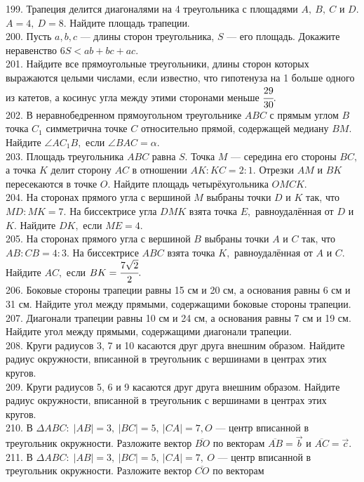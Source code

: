 \documentclass[12pt]{article}
\begin{document}
199. Трапеция делится диагоналями на 4 треугольника с площадями $A,\ B,\ C$ и $D.$ $A=4,\ D=8.$ Найдите площадь трапеции.\\
200. Пусть $a,b,c$ --- длины сторон треугольника, $S$ --- его площадь. Докажите неравенство $6S<ab+bc+ac.$\\
201. Найдите все прямоугольные треугольники, длины сторон которых выражаются целыми числами, если известно, что гипотенуза на 1 больше одного из катетов, а косинус угла между этими сторонами меньше $\cfrac{29}{30}.$\\
202. В неравнобедренном прямоугольном треугольнике $ABC$ с прямым углом $B$ точка $C_1$ симметрична точке $C$ относительно прямой, содержащей медиану $BM.$ Найдите $\angle AC_1B,$ если $\angle BAC=\alpha.$\\
203. Площадь треугольника $ABC$ равна $S.$ Точка $M$ --- середина его стороны $BC,$ а точка $K$ делит сторону $AC$ в отношении $AK:KC=2:1.$ Отрезки $AM$ и $BK$ пересекаются в точке $O.$ Найдите площадь четырёхугольника $OMCK.$\\
204. На сторонах прямого угла с вершиной $M$ выбраны точки $D$ и $K$ так, что $MD : MK = 7.$ На
биссектрисе угла $DMK$ взята точка $E,$ равноудалённая от $D$ и $K.$ Найдите $DK,$ если $ME = 4.$\\
205. На сторонах прямого угла с вершиной $B$ выбраны точки $A$ и $C$ так, что $AB : CB = 4 : 3.$ На
биссектрисе $ABC$ взята точка $K,$ равноудалённая от $A$ и $C.$ Найдите $AC,$ если $BK =\cfrac{7\sqrt{2}}{2}.$\\
206. Боковые стороны трапеции равны 15 см и 20 см, а основания равны 6 см и 31 см. Найдите угол между прямыми, содержащими боковые стороны трапеции.\\
207. Диагонали трапеции равны 10 см и 24 см, а основания равны 7 см и 19 см. Найдите угол между прямыми, содержащими диагонали трапеции.\\
208. Круги радиусов 3, 7 и 10 касаются друг друга внешним образом. Найдите радиус окружности, вписанной в треугольник с вершинами в центрах этих кругов.\\
209. Круги радиусов 5, 6 и 9 касаются друг друга внешним образом. Найдите радиус окружности, вписанной в треугольник с вершинами в центрах этих кругов.\\
210. В $\Delta ABC:\; |AB| = 3,\ |BC| = 5,\ |CA| = 7, O$ --- центр вписанной в треугольник окружности.
Разложите вектор  $\overline{BO}$ по векторам  $\overline{AB}=\vec{b}$ и  $\overline{AC}=\vec{c}.$\\
211. В $\Delta ABC:\; |AB| = 3,\ |BC| = 5,\ |CA| = 7,\ O$ --- центр вписанной в треугольник окружности. Разложите вектор $\overline{CO}$ по векторам
\end{document}
